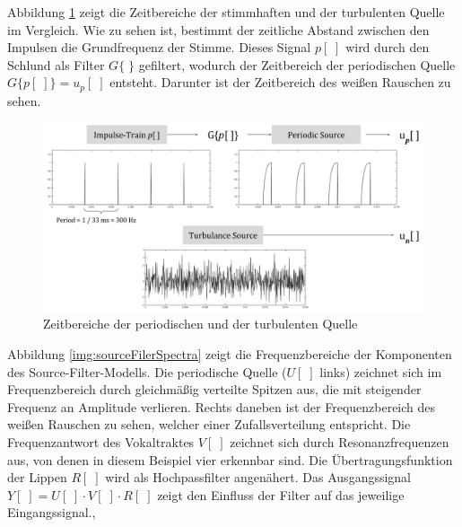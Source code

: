 Abbildung \ref{img:glottalSource} zeigt die Zeitbereiche der stimmhaften und der turbulenten Quelle im Vergleich. Wie zu sehen ist, bestimmt der zeitliche Abstand zwischen den Impulsen die Grundfrequenz der Stimme. Dieses Signal $p[\;]$ wird durch den Schlund als Filter $G\{ \; \}$ gefiltert, wodurch der Zeitbereich der periodischen Quelle $G\{p[\;]\} = u_p[\;]$ entsteht. Darunter ist der Zeitbereich des weißen Rauschen zu sehen.\cite[Source]{speechAcoustics}

\begin{figure}[h]
	\centering
	\includegraphics[width=1\textwidth]{bilder/glottalSource.png}
	\caption[Zeitbereiche der periodischen und der turbulenten Quelle]{Zeitbereiche der periodischen und der turbulenten Quelle \cite[Source]{speechAcoustics}}
	\label{img:glottalSource}
\end{figure}	

Abbildung \ref{img:sourceFilerSpectra} zeigt die Frequenzbereiche der Komponenten des Source-Filter-Modells. Die periodische Quelle ($U[\;]$ links) zeichnet sich im Frequenzbereich durch gleichmäßig verteilte Spitzen aus, die mit steigender Frequenz an Amplitude verlieren. Rechts daneben ist der Frequenzbereich des weißen Rauschen zu sehen, welcher einer Zufallsverteilung entspricht. Die Frequenzantwort des Vokaltraktes $V[\;]$ zeichnet sich durch Resonanzfrequenzen aus, von denen in diesem Beispiel vier  erkennbar sind. Die Übertragungsfunktion der Lippen $R[\;]$ wird als Hochpassfilter angenähert. Das Ausgangssignal $Y[\;] = U[\;] \cdot V[\;] \cdot R[\;]$ zeigt den Einfluss der Filter auf das jeweilige Eingangssignal.\cite[\emph{Source estimation}]{ricardo_ceps}, \cite[\emph{Vocal Tract Resonance}]{speechAcoustics}

